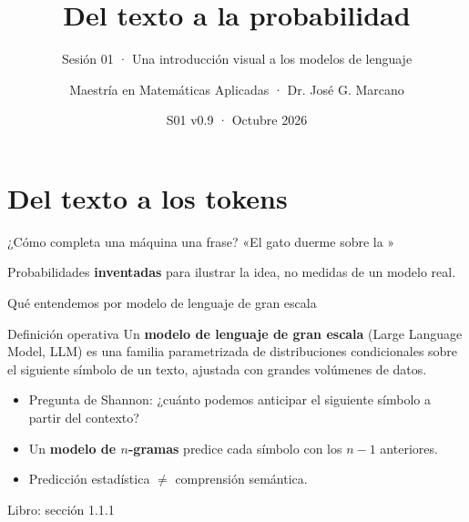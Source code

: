\documentclass[aspectratio=169,10pt]{beamer}
\title{Del texto a la probabilidad}
\subtitle{Sesión 01 · Una introducción visual a los modelos de lenguaje}
\author{Maestría en Matemáticas Aplicadas · Dr. José G. Marcano}
\date{S01 v0.9 · Octubre 2026}
\newcommand{\libro}[1]{{\scriptsize\color{gray}Libro: #1}}
\begin{document}
\begin{frame}\titlepage\end{frame}

\section{Del texto a los tokens}
\begin{frame}{¿Cómo completa una máquina una frase?}
\centering\Large «El gato duerme sobre la \underline{\hspace{1.8cm}}»\\[5mm]
\vspace{4mm}\small Probabilidades \textbf{inventadas} para ilustrar la idea, no medidas de un modelo real.
\end{frame}

\begin{frame}{Qué entendemos por modelo de lenguaje de gran escala}
\begin{block}{Definición operativa}
Un \textbf{modelo de lenguaje de gran escala} (Large Language Model, LLM) es una
familia parametrizada de distribuciones condicionales sobre el siguiente símbolo
de un texto, ajustada con grandes volúmenes de datos.
\end{block}
\medskip
\begin{itemize}
\item Pregunta de Shannon: ¿cuánto podemos anticipar el siguiente símbolo a partir del contexto?
\item Un \textbf{modelo de $n$-gramas} predice cada símbolo con los $n-1$ anteriores.
\item Predicción estadística $\neq$ comprensión semántica.
\end{itemize}
\libro{sección 1.1.1}
\end{frame}
\end{document}
